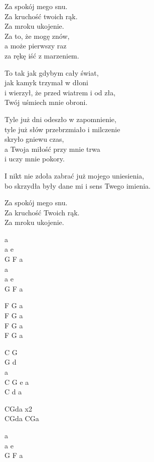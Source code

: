 \begin{text}
    Za spokój mego snu.\\
    Za kruchość twoich rąk.\\
    Za mroku ukojenie.\\
    Za to, że mogę znów,\\
    a może pierwszy raz\\
    za rękę iść z marzeniem.

    To tak jak gdybym cały świat,\\
    jak kamyk trzymał w dłoni\\
    i wierzył, że przed wiatrem i od zła,\\
    Twój uśmiech mnie obroni.

    Tyle już dni odeszło w zapomnienie,\\
    tyle już słów przebrzmiało i milczenie\\
    skryło gniewu czas,\\
    a Twoja miłość przy mnie trwa\\
    i uczy mnie pokory.

    I nikt nie zdoła zabrać już mojego uniesienia,\\
    bo skrzydła były dane mi i sens Twego imienia.

    Za spokój mego snu.\\
    Za kruchość Twoich rąk.\\
    Za mroku ukojenie.
\end{text}
\begin{chord}
    a\\
    a e\\
    G F a\\
    a\\
    a e\\
    G F a

    F G a\\
    F G a\\
    F G a\\
    F G a

    C G\\
    G d\\
    a\\
    C G e a\\
    C d a

    CGda x2\\
    CGda CGa

    a\\
    a e\\
    G F a
\end{chord}